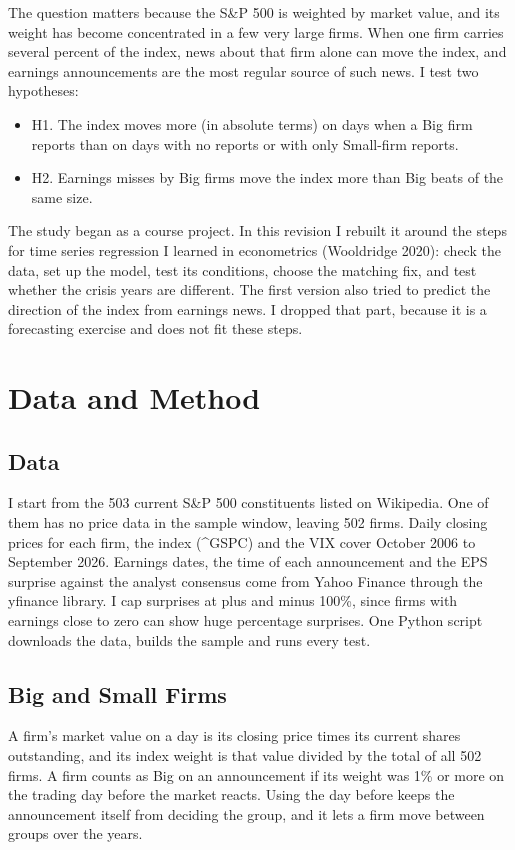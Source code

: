\documentclass[preprint,letterpaper,11pt,authoryear]{elsarticle}
\begin{document}
The question matters because the S\&P 500 is weighted by market value, and its weight has become concentrated in a few very large firms. When one firm carries several percent of the index, news about that firm alone can move the index, and earnings announcements are the most regular source of such news. I test two hypotheses:

\begin{itemize}
  \item H1. The index moves more (in absolute terms) on days when a Big firm reports than on days with no reports or with only Small-firm reports.
  \item H2. Earnings misses by Big firms move the index more than Big beats of the same size.
\end{itemize}

The study began as a course project. In this revision I rebuilt it around the steps for time series regression I learned in econometrics (Wooldridge 2020): check the data, set up the model, test its conditions, choose the matching fix, and test whether the crisis years are different. The first version also tried to predict the direction of the index from earnings news. I dropped that part, because it is a forecasting exercise and does not fit these steps.

\section{Data and Method}

\subsection{Data}
I start from the 503 current S\&P 500 constituents listed on Wikipedia. One of them has no price data in the sample window, leaving 502 firms. Daily closing prices for each firm, the index (\^{}GSPC) and the VIX cover October 2006 to September 2026. Earnings dates, the time of each announcement and the EPS surprise against the analyst consensus come from Yahoo Finance through the yfinance library. I cap surprises at plus and minus 100\%, since firms with earnings close to zero can show huge percentage surprises. One Python script downloads the data, builds the sample and runs every test.

\subsection{Big and Small Firms}
A firm's market value on a day is its closing price times its current shares outstanding, and its index weight is that value divided by the total of all 502 firms. A firm counts as Big on an announcement if its weight was 1\% or more on the trading day before the market reacts. Using the day before keeps the announcement itself from deciding the group, and it lets a firm move between groups over the years.
\end{document}
